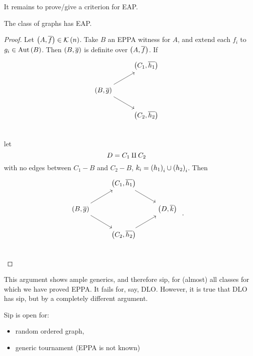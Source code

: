\documentclass{amsart}
\begin{document}
It remains to prove/give a criterion for EAP. 

\begin{prop}
The class of graphs has EAP.
\end{prop}

\begin{proof}
Let $\left(A , \overline{f}\right) \in \mathcal{K}\left(n\right)$. Take $B$ an EPPA witness for $A$,
and extend each $f_i$ to $g_i \in \operatorname{Aut}\left(B\right)$. Then $\left(B , \overline{g}\right)$
is definite over $\left(A , \overline{f}\right)$. If
\begin{equation}
\begin{tikzcd}
& \left(C_1 , \oline{h_1}\right)\\
\left(B , \oline{g}\right)\arrow{ur}\arrow{dr} & \\
& \left(C_2 , \oline{h_2}\right)\\
\end{tikzcd}
\end{equation}
let 
\begin{equation}
D = C_1 \amalg C_2
\end{equation}
with no edges between $C_1 \minus B$ and $C_2 \minus B$, $k_i = \left(h_1\right)_i \cup
\left(h_2\right)_i$. Then
\begin{equation}
\begin{tikzcd}
& \left(C_1 , \oline{h_1}\right)\arrow{dr}&\\
\left(B , \oline{g}\right)\arrow{ur}\arrow{dr} && \left(D , \oline{k}\right)\\
& \left(C_2 , \oline{h_2}\right)\arrow{ur}&\\
\end{tikzcd} \ .
\end{equation}
\end{proof}

This argument shows ample generics, and therefore sip, for (almost) all classes for which
we have proved EPPA. It fails for, say, DLO.
However, it is true that DLO has sip, but by a completely different argument. 

\begin{rmk}
Sip is open for:
\begin{itemize}
\item random ordered graph,
\item generic tournament (EPPA is not known)
\end{itemize}
\end{rmk}
\end{document}
